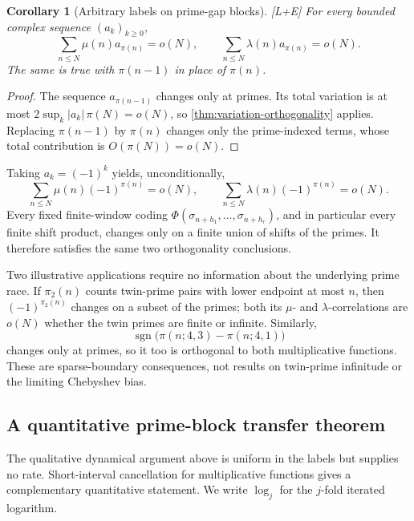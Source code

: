 \documentclass[11pt]{article}
\newtheorem{corollary}[theorem]{Corollary}
\theoremstyle{definition}
\theoremstyle{remark}
\newcommand{\status}[1]{\textnormal{\textcolor{accent}{\footnotesize[#1]}}}
\DeclareMathOperator{\sgn}{sgn}
\begin{document}
\begin{corollary}[Arbitrary labels on prime-gap blocks]\label{cor:prime-block-labels}
\status{L+E}
For every bounded complex sequence $(a_k)_{k\ge0}$,
\begin{equation}\label{eq:any-prime-label}
 \sum_{n\le N}\mu(n)a_{\pi(n)}=o(N),\qquad
 \sum_{n\le N}\lambda(n)a_{\pi(n)}=o(N).
\end{equation}
The same is true with $\pi(n-1)$ in place of $\pi(n)$.
\end{corollary}

\begin{proof}
The sequence $a_{\pi(n-1)}$ changes only at primes.  Its total variation is at most
$2\sup_k|a_k|\,\pi(N)=o(N)$, so \cref{thm:variation-orthogonality} applies.  Replacing
$\pi(n-1)$ by $\pi(n)$ changes only the prime-indexed terms, whose total contribution is
$O(\pi(N))=o(N)$.
\end{proof}

Taking $a_k=(-1)^k$ yields, unconditionally,
\begin{equation}\label{eq:prime-parity-mu-lambda}
 \sum_{n\le N}\mu(n)(-1)^{\pi(n)}=o(N),
 \qquad
 \sum_{n\le N}\lambda(n)(-1)^{\pi(n)}=o(N).
\end{equation}
Every fixed finite-window coding
$\Phi(\sigma_{n+h_1},\ldots,\sigma_{n+h_r})$, and in particular every finite shift
product, changes only on a finite union of shifts of the primes.  It therefore satisfies
the same two orthogonality conclusions.

Two illustrative applications require no information about the underlying prime race.
If $\pi_2(n)$ counts twin-prime pairs with lower endpoint at most $n$, then
$(-1)^{\pi_2(n)}$ changes on a subset of the primes; both its $\mu$- and
$\lambda$-correlations are $o(N)$ whether the twin primes are finite or infinite.
Similarly,
\[
 \sgn\bigl(\pi(n;4,3)-\pi(n;4,1)\bigr)
\]
changes only at primes, so it too is orthogonal to both multiplicative functions.  These
are sparse-boundary consequences, not results on twin-prime infinitude or the limiting
Chebyshev bias.

\subsection{A quantitative prime-block transfer theorem}

The qualitative dynamical argument above is uniform in the labels but supplies no
rate.  Short-interval cancellation for multiplicative functions gives a complementary
quantitative statement.  We write $\log_j$ for the $j$-fold iterated logarithm.
\end{document}
